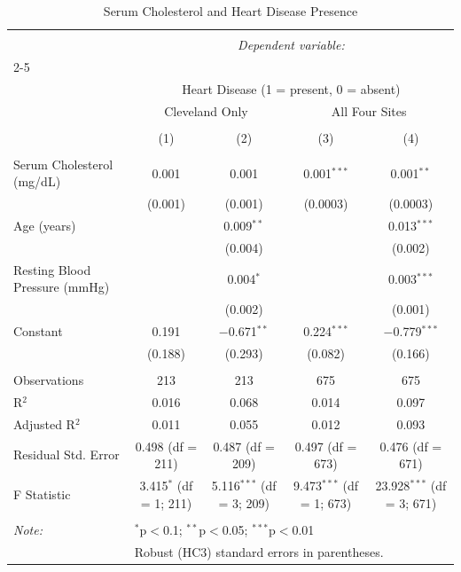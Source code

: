 \documentclass[
  11pt,
]{scrartcl}
\begin{document}
\begin{table}[H] \centering 
  \caption{Serum Cholesterol and Heart Disease Presence} 
  \label{} 
\footnotesize 
\begin{tabular}{@{\extracolsep{5pt}}lcccc} 
\\[-1.8ex]\hline 
\hline \\[-1.8ex] 
 & \multicolumn{4}{c}{\textit{Dependent variable:}} \\ 
\cline{2-5} 
\\[-1.8ex] & \multicolumn{4}{c}{Heart Disease (1 = present, 0 = absent)} \\ 
 & \multicolumn{2}{c}{Cleveland Only} & \multicolumn{2}{c}{All Four Sites} \\ 
\\[-1.8ex] & (1) & (2) & (3) & (4)\\ 
\hline \\[-1.8ex] 
 Serum Cholesterol (mg/dL) & 0.001 & 0.001 & 0.001$^{***}$ & 0.001$^{**}$ \\ 
  & (0.001) & (0.001) & (0.0003) & (0.0003) \\ 
  Age (years) &  & 0.009$^{**}$ &  & 0.013$^{***}$ \\ 
  &  & (0.004) &  & (0.002) \\ 
  Resting Blood Pressure (mmHg) &  & 0.004$^{*}$ &  & 0.003$^{***}$ \\ 
  &  & (0.002) &  & (0.001) \\ 
  Constant & 0.191 & $-$0.671$^{**}$ & 0.224$^{***}$ & $-$0.779$^{***}$ \\ 
  & (0.188) & (0.293) & (0.082) & (0.166) \\ 
 \hline \\[-1.8ex] 
Observations & 213 & 213 & 675 & 675 \\ 
R$^{2}$ & 0.016 & 0.068 & 0.014 & 0.097 \\ 
Adjusted R$^{2}$ & 0.011 & 0.055 & 0.012 & 0.093 \\ 
Residual Std. Error & 0.498 (df = 211) & 0.487 (df = 209) & 0.497 (df = 673) & 0.476 (df = 671) \\ 
F Statistic & 3.415$^{*}$ (df = 1; 211) & 5.116$^{***}$ (df = 3; 209) & 9.473$^{***}$ (df = 1; 673) & 23.928$^{***}$ (df = 3; 671) \\ 
\hline 
\hline \\[-1.8ex] 
\textit{Note:}  & \multicolumn{4}{l}{$^{*}$p$<$0.1; $^{**}$p$<$0.05; $^{***}$p$<$0.01} \\ 
 & \multicolumn{4}{l}{Robust (HC3) standard errors in parentheses.} \\ 
\end{tabular} 
\end{table}
\end{document}
